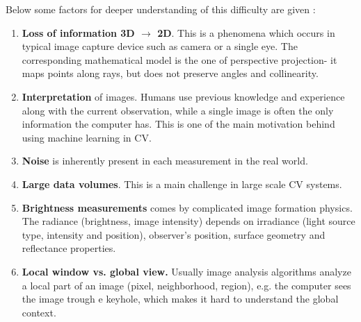 Below some factors for deeper understanding of this difficulty are given \cite{Sonka99}:

\begin{enumerate}
\item {\bf Loss of information 3D $\rightarrow$ 2D}. This is a phenomena which occurs in typical image capture device such as camera or a single eye. The corresponding mathematical model is the one of perspective projection- it maps points along rays, but does not preserve angles and collinearity.
\item {\bf Interpretation} of images. Humans use previous knowledge and experience along with the current observation, while a single image is often the only information the computer has. This is one of the  main motivation behind using machine learning in CV.
\item {\bf Noise} is inherently present in each measurement in the real world. 
\item {\bf Large data volumes}. This is a main challenge in large scale CV systems.
\item {\bf Brightness measurements} comes by complicated image formation physics. The radiance (brightness, image intensity) depends on irradiance (light source type, intensity and position), observer's position, surface geometry and reflectance properties.
\item {\bf Local window vs. global view.} Usually image analysis algorithms analyze a local part of an image (pixel, neighborhood, region), e.g. the computer sees the image trough e keyhole, which makes it hard to understand the global context.
\end{enumerate}
 
